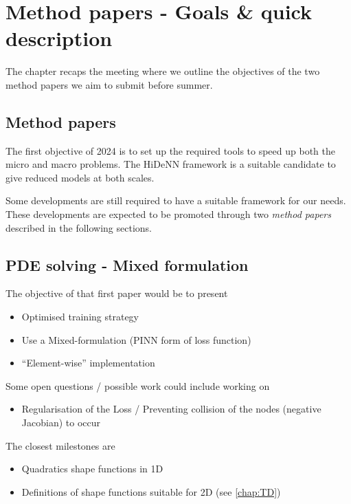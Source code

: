 \chapter[The 6$^{\text{th}}$ of February 2024 - Method papers - Goals \& quick description]{Method papers - Goals \& quick description}
\label{chap:MethodPapers}
\begin{chapabstract}
    The chapter recaps the meeting where we outline the objectives of the two method papers we aim to submit before summer.
\end{chapabstract}

\minitoc

\section{Method papers}

The first objective of 2024 is to set up the required tools to speed up both the micro and macro problems. The HiDeNN framework \parencite{zhang_hierarchical_2021} is a suitable candidate to give reduced models at both scales.

Some developments are still required to have a suitable framework for our needs. These developments are expected to be promoted through two \emph{method papers} described in the following sections.

\section{PDE solving - Mixed formulation}
The objective of that first paper would be to present
\begin{itemize}
    \item Optimised training strategy 
    \item Use a Mixed-formulation (PINN form of loss function)
    \item ``Element-wise'' implementation
\end{itemize}

Some open questions / possible work could include working on 
\begin{itemize}
    \item Regularisation of the Loss / Preventing collision of the nodes (negative Jacobian) to occur
\end{itemize}

The closest milestones are
\begin{itemize}
    \item Quadratics shape functions in 1D
    \item Definitions of shape functions suitable for 2D (see \cref{chap:TD})
\end{itemize}

